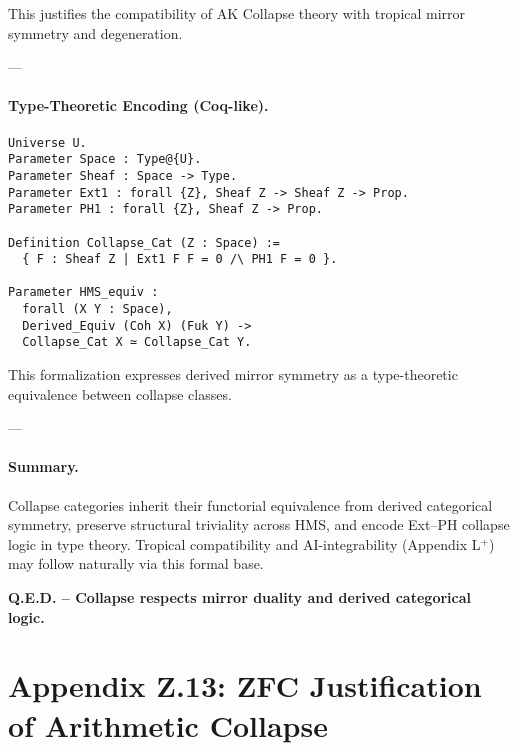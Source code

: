 \documentclass[11pt]{article}
\begin{document}
\begin{axiom}
\begin{axiom}
{{This justifies the compatibility of AK Collapse theory with tropical mirror symmetry and degeneration.

---

\paragraph{Type-Theoretic Encoding (Coq-like).}

\begin{lstlisting}[language=Coq, caption=Collapse Functor Equivalence in Type Theory]
Universe U.
Parameter Space : Type@{U}.
Parameter Sheaf : Space -> Type.
Parameter Ext1 : forall {Z}, Sheaf Z -> Sheaf Z -> Prop.
Parameter PH1 : forall {Z}, Sheaf Z -> Prop.

Definition Collapse_Cat (Z : Space) :=
  { F : Sheaf Z | Ext1 F F = 0 /\ PH1 F = 0 }.

Parameter HMS_equiv :
  forall (X Y : Space),
  Derived_Equiv (Coh X) (Fuk Y) ->
  Collapse_Cat X ≃ Collapse_Cat Y.
\end{lstlisting}

This formalization expresses derived mirror symmetry as a type-theoretic equivalence between collapse classes.

---

\paragraph{Summary.}

Collapse categories inherit their functorial equivalence from derived categorical symmetry,  
preserve structural triviality across HMS, and encode Ext–PH collapse logic in type theory.  
Tropical compatibility and AI-integrability (Appendix L$^+$) may follow naturally via this formal base.

\begin{center}
\textbf{Q.E.D. – Collapse respects mirror duality and derived categorical logic.}
\end{center}




\section*{Appendix Z.13: ZFC Justification of Arithmetic Collapse}

}}
\end{axiom}
\end{axiom}
\end{document}
